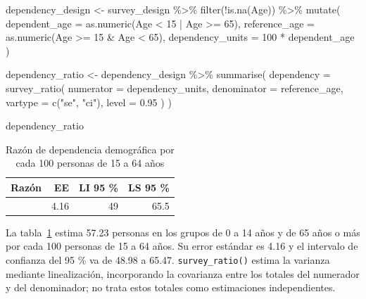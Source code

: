 \documentclass[
  spanish,
  11pt,
  letterpaper,
  oneside,
  open=any]{scrbook}
\newenvironment{Shaded}{\begin{snugshade}}{\end{snugshade}}
\newcommand{\AttributeTok}[1]{\textcolor[rgb]{0.40,0.45,0.13}{#1}}
\newcommand{\DecValTok}[1]{\textcolor[rgb]{0.68,0.00,0.00}{#1}}
\newcommand{\FloatTok}[1]{\textcolor[rgb]{0.68,0.00,0.00}{#1}}
\newcommand{\FunctionTok}[1]{\textcolor[rgb]{0.28,0.35,0.67}{#1}}
\newcommand{\NormalTok}[1]{\textcolor[rgb]{0.00,0.23,0.31}{#1}}
\newcommand{\OtherTok}[1]{\textcolor[rgb]{0.00,0.23,0.31}{#1}}
\newcommand{\SpecialCharTok}[1]{\textcolor[rgb]{0.37,0.37,0.37}{#1}}
\newcommand{\StringTok}[1]{\textcolor[rgb]{0.13,0.47,0.30}{#1}}
\begin{document}
\begin{Shaded}
\begin{Highlighting}[]
\NormalTok{dependency\_design }\OtherTok{\textless{}{-}}\NormalTok{ survey\_design }\SpecialCharTok{\%\textgreater{}\%}
  \FunctionTok{filter}\NormalTok{(}\SpecialCharTok{!}\FunctionTok{is.na}\NormalTok{(Age)) }\SpecialCharTok{\%\textgreater{}\%}
  \FunctionTok{mutate}\NormalTok{(}
    \AttributeTok{dependent\_age =} \FunctionTok{as.numeric}\NormalTok{(Age }\SpecialCharTok{\textless{}} \DecValTok{15} \SpecialCharTok{|}\NormalTok{ Age }\SpecialCharTok{\textgreater{}=} \DecValTok{65}\NormalTok{),}
    \AttributeTok{reference\_age =} \FunctionTok{as.numeric}\NormalTok{(Age }\SpecialCharTok{\textgreater{}=} \DecValTok{15} \SpecialCharTok{\&}\NormalTok{ Age }\SpecialCharTok{\textless{}} \DecValTok{65}\NormalTok{),}
    \AttributeTok{dependency\_units =} \DecValTok{100} \SpecialCharTok{*}\NormalTok{ dependent\_age}
\NormalTok{  )}

\NormalTok{dependency\_ratio }\OtherTok{\textless{}{-}}\NormalTok{ dependency\_design }\SpecialCharTok{\%\textgreater{}\%}
  \FunctionTok{summarise}\NormalTok{(}
    \AttributeTok{dependency =} \FunctionTok{survey\_ratio}\NormalTok{(}
      \AttributeTok{numerator =}\NormalTok{ dependency\_units,}
      \AttributeTok{denominator =}\NormalTok{ reference\_age,}
      \AttributeTok{vartype =} \FunctionTok{c}\NormalTok{(}\StringTok{"se"}\NormalTok{, }\StringTok{"ci"}\NormalTok{),}
      \AttributeTok{level =} \FloatTok{0.95}
\NormalTok{    )}
\NormalTok{  )}

\NormalTok{dependency\_ratio}
\end{Highlighting}
\end{Shaded}

{

\begin{longtable}[]{@{}rrrr@{}}

\caption{\label{tbl-razon-dependencia}Razón de dependencia demográfica
por cada 100 personas de 15 a 64 años}

\tabularnewline

\toprule\noalign{}
Razón & EE & LI 95 \% & LS 95 \% \\
\midrule\noalign{}
\endhead
\bottomrule\noalign{}
\endlastfoot
57.2 & 4.16 & 49 & 65.5 \\

\end{longtable}

}

La tabla~\ref{tbl-razon-dependencia} estima 57.23 personas en los grupos
de 0 a 14 años y de 65 años o más por cada 100 personas de 15 a 64 años.
Su error estándar es 4.16 y el intervalo de confianza del 95 \% va de
48.98 a 65.47. \texttt{survey\_ratio()} estima la varianza mediante
linealización, incorporando la covarianza entre los totales del
numerador y del denominador; no trata estos totales como estimaciones
independientes.
\end{document}
